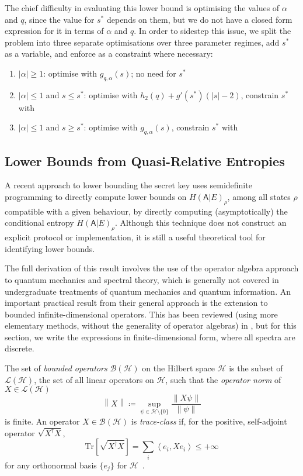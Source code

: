 \documentclass[10pt, a4paper]{article}
\numberwithin{equation}{section} %
\theoremstyle{definition}
\theoremstyle{plain}
\newcommand{\norm}[1]{\left\lVert#1\right\rVert}
\newcommand{\abs}[1]{\left\lvert#1\right\rvert}
\newcommand{\?}{\mathrel{?}} %
\newcommand{\angleb}[1]{\left\langle #1 \right\rangle} %
\newcommand{\Tr}{\mathrm{Tr}} %
\newcommand{\Hs}{\mathcal{H}} %
\newcommand{\crv}[1]{\mathsf{#1}}
\begin{document}
    The chief difficulty in evaluating this lower bound is optimising the values of \(\alpha\) and \(q\), since the value for \(s^*\) depends on them, but we do not have a closed form expression for it in terms of \(\alpha\) and \(q\). In order to sidestep this issue, we split the problem into three separate optimisations over three parameter regimes, add \(s^*\) as a variable, and enforce  as a constraint where necessary:
    \begin{enumerate}
      \item \(\abs{\alpha} \geq 1\): optimise with \(g_{q,\alpha}(s)\); no need for \(s^*\)
      \item \(\abs{\alpha} \leq 1\) and \(s \leq s^*\): optimise with \(h_2(q) + g'(s^*)(\abs{s}-2)\), constrain \(s^*\) with 
      \item \(\abs{\alpha} \leq 1\) and \(s \geq s^*\): optimise with \(g_{q,\alpha}(s)\), constrain \(s^*\) with 
    \end{enumerate}

    \subsection{Lower Bounds from Quasi-Relative Entropies}\label{sec:diqkd_qre}

    A recent approach to lower bounding the secret key uses semidefinite programming to directly compute lower bounds on \(H{(\crv{A}|E)}_{\rho}\), among all states \(\rho\) compatible with a given behaviour, by directly computing (asymptotically) the conditional entropy \(H{(\crv{A}|E)}_{\rho}\). Although this technique does not construct an explicit protocol or implementation, it is still a useful theoretical tool for identifying lower bounds.

    The full derivation of this result involves the use of the operator algebra approach to quantum mechanics and spectral theory, which is generally not covered in undergraduate treatments of quantum mechanics and quantum information. An important practical result from their general approach is the extension to bounded infinite-dimensional operators. This has been reviewed (using more elementary methods, without the generality of operator algebras) in , but for this section, we write the expressions in finite-dimensional form, where all spectra are discrete.

    The set of \emph{bounded operators} \(\mathcal{B}(\Hs)\) on the Hilbert space \(\Hs\) is the subset of \(\mathcal{L}(\Hs)\), the set of all linear operators on \(\Hs\), such that the \emph{operator norm} of \(X \in \mathcal{L}(\Hs)\)
      \[ \norm{X} \coloneqq \sup_{\psi \in \Hs \setminus \{0\}} \frac{\norm{X\psi}}{\norm{\psi}} \]
      is finite. An operator \(X \in \mathcal{B}(\Hs)\) is \emph{trace-class} if, for the positive, self-adjoint operator \(\sqrt{X^{\dagger}X}\),
      \[ \Tr\left[ \sqrt{X^{\dagger}X} \right] = \sum_{i} \angleb{e_i, Xe_i} \leq +\infty \]
      for any orthonormal basis \(\{e_j\}\) for \(\Hs\)~\cite{HallQuantumForMath}. 
\end{document}
